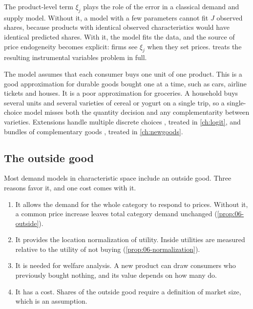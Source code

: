 The product-level term $\xi_j$ plays the role of the error in a classical demand and supply model. Without it,
a model with a few parameters cannot fit $J$ observed shares, because products with identical observed
characteristics would have identical predicted shares. With it, the model fits the data, and the source of
price endogeneity becomes explicit: firms see $\xi_j$ when they set prices.  treats the
resulting instrumental variables problem in full.

The model assumes that each consumer buys one unit of one product. This is a good approximation for durable
goods bought one at a time, such as cars, airline tickets and houses. It is a poor approximation for groceries.
A household buys several units and several varieties of cereal or yogurt on a single trip, so a single-choice
model misses both the quantity decision and any complementarity between varieties. Extensions handle
multiple discrete choices \citep{Hendel1999}, treated in \cref{ch:logit}, and bundles of complementary goods
\citep{Gentzkow2007}, treated in \cref{ch:newgoods}.

\subsection{The outside good}\label{sec:06-outside}

Most demand models in characteristic space include an outside good. Three reasons favor it, and one cost
comes with it.
\begin{enumerate}
  \item It allows the demand for the whole category to respond to prices. Without it, a common price increase
  leaves total category demand unchanged (\cref{prop:06-outside}).
  \item It provides the location normalization of utility. Inside utilities are measured relative to the
  utility of not buying (\cref{prop:06-normalization}).
  \item It is needed for welfare analysis. A new product can draw consumers who previously bought nothing,
  and its value depends on how many do.
  \item It has a cost. Shares of the outside good require a definition of market size, which is an
  assumption.
\end{enumerate}

